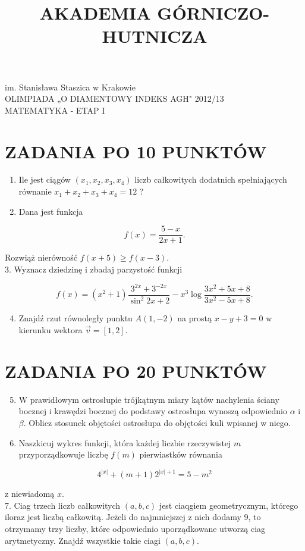 \documentclass[10pt]{article}
\title{AKADEMIA GÓRNICZO-HUTNICZA }
\author{}
\date{}
\begin{document}
\maketitle
im. Stanisława Staszica w Krakowie\\
OLIMPIADA „O DIAMENTOWY INDEKS AGH" 2012/13\\
MATEMATYKA - ETAP I

\section*{ZADANIA PO 10 PUNKTÓW}
\begin{enumerate}
  \item Ile jest ciągów $\left(x_{1}, x_{2}, x_{3}, x_{4}\right)$ liczb całkowitych dodatnich spełniających równanie $x_{1}+x_{2}+x_{3}+x_{4}=12$ ?
  \item Dana jest funkcja
\end{enumerate}

$$
f(x)=\frac{5-x}{2 x+1} .
$$

Rozwiąż nierówność $f(x+5) \geq f(x-3)$.\\
3. Wyznacz dziedzinę i zbadaj parzystość funkcji

$$
f(x)=\left(x^{2}+1\right) \frac{3^{2 x}+3^{-2 x}}{\sin ^{2} 2 x+2}-x^{3} \log \frac{3 x^{2}+5 x+8}{3 x^{2}-5 x+8} .
$$

\begin{enumerate}
  \setcounter{enumi}{3}
  \item Znajdź rzut równoległy punktu $A(1,-2)$ na prostą $x-y+3=0$ w kierunku wektora $\vec{v}=[1,2]$.
\end{enumerate}

\section*{ZADANIA PO 20 PUNKTÓW}
\begin{enumerate}
  \setcounter{enumi}{4}
  \item W prawidłowym ostrosłupie trójkątnym miary kątów nachylenia ściany bocznej i krawędzi bocznej do podstawy ostrosłupa wynoszą odpowiednio $\alpha$ i $\beta$. Oblicz stosunek objętości ostrosłupa do objętości kuli wpisanej w niego.
  \item Naszkicuj wykres funkcji, która każdej liczbie rzeczywistej $m$ przyporządkowuje liczbę $f(m)$ pierwiastków równania
\end{enumerate}

$$
4^{|x|}+(m+1) 2^{|x|+1}=5-m^{2}
$$

z niewiadomą $x$.\\
7. Ciag trzech liczb całkowitych $(a, b, c)$ jest ciaqgiem geometrycznym, którego iloraz jest liczbą całkowitą. Jeżeli do najmniejszej z nich dodamy 9, to otrzymamy trzy liczby, które odpowiednio uporządkowane utworzą ciag arytmetyczny. Znajdź wszystkie takie ciagi $(a, b, c)$.
\end{document}
